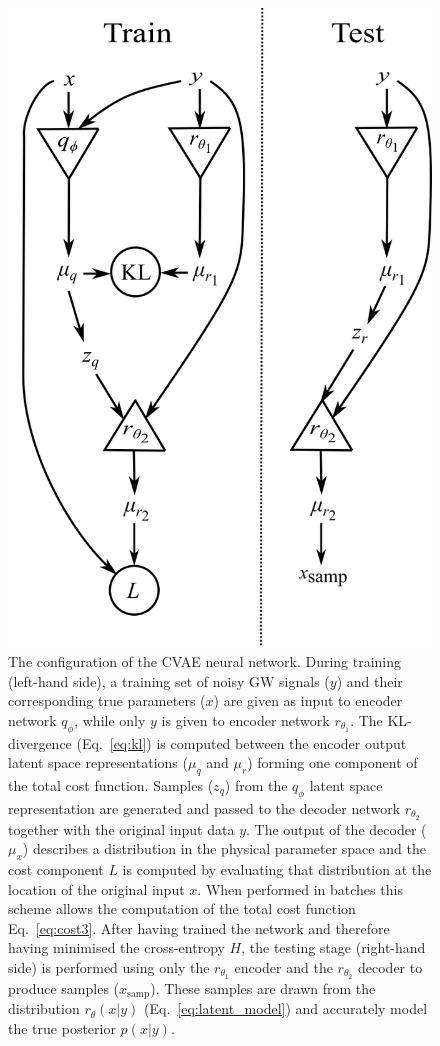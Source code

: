 \begin{figure}
    \begin{center}
    \includegraphics[width=0.75\columnwidth]{figures/network_setup.png}
    \caption{\label{fig:network_config} 
     The configuration of the \ac{CVAE} neural network. During training (left-hand side), a training set of noisy \ac{GW} signals ($y$) and their corresponding true parameters ($x$) are given as input to encoder network $q_{\phi}$, while only $y$ is given to encoder network $r_{\theta_1}$. The \ac{KL}-divergence (Eq.~\ref{eq:kl}) is computed between the encoder output latent space representations ($\mu_q$ and $\mu_r$) forming one component of the total cost function. Samples ($z_q$) from the $q_{\phi}$ latent space representation are generated and passed to the decoder network $r_{\theta_2}$ together with the original input data $y$. The output of the decoder ($\mu_x$) describes a distribution in the physical parameter space and the cost component $L$ is computed by evaluating that distribution at the location of the original input $x$. When performed in batches this scheme allows the computation of the total cost function Eq.~\ref{eq:cost3}. After having trained the network and therefore having minimised the cross-entropy $H$, the testing stage (right-hand side) is performed using only the $r_{\theta_1}$ encoder and the $r_{\theta_2}$ decoder to produce samples ($x_{\text{samp}}$). These samples are drawn from the distribution $r_{\theta}(x|y)$ (Eq.~\ref{eq:latent_model}) and accurately model the true posterior $p(x|y)$.}
    \end{center}
\end{figure}


